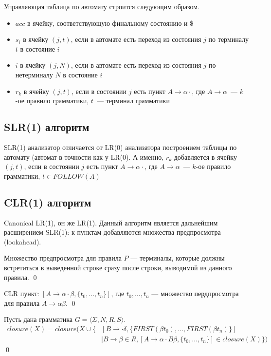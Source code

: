 Управляющая таблица по автомату строится следующим образом.

\begin{itemize}
    \item $acc$ в ячейку, соответствующую финальному состоянию и \$
    \item $s_i$ в ячейку $(j,t)$, если в автомате есть переход из состояния $j$ по терминалу $t$ в состояние $i$
    \item $i$ в ячейку $(j, N)$, если в автомате есть переход из состояния $j$ по нетерминалу $N$ в состояние $i$
    \item $r_k$ в ячейку $(j,t)$, если в состоянии $j$ есть пункт $A \to \alpha \cdot$, где $A \to \alpha$~--- $k$-ое правило грамматики, $t$~--- терминал грамматики
  \end{itemize}

\subsection{SLR(1) алгоритм}

SLR(1) анализатор отличается от LR(0) анализатора построением таблицы по автомату (автомат в точности как у LR(0).
А именно, $r_k$ добавляется в ячейку $(j,t)$, если в состоянии $j$ есть пункт $A \to \alpha \cdot$, где $A \to \alpha$~--- $k$-ое правило грамматики, $t \in FOLLOW(A)$

\subsection{CLR(1) алгоритм}

Canonical LR(1), он же LR(1).
Данный алгоритм является дальнейшим расширением SLR(1): к пунктам добавляются множества предпросмотра (lookahead).

\begin{definition}
Множество предпросмотра для правила $P$ --- терминалы, которые должны встретиться в выведенной строке сразу после строки, выводимой из данного правила.
\qed
\end{definition}

\begin{definition}
CLR пункт: $ [A \to \alpha \cdot \beta, \{ t_0, \dots, t_n\}] $,
где $t_0, \dots, t_n$ --- множество пердпросмотра для правила $A \to \alpha \beta$.
\qed
\end{definition}


\begin{definition}
Пусть дана грамматика $G = \langle \Sigma, N, R, S\rangle$.
\begin{align*}
 closure(X) = closure(X \cup \{&[B \to \cdot \delta, \{FIRST(\beta t_0), \dots, FIRST(\beta t_n)\}] \\
                               &\mid B \to \beta \in R, [A \to \alpha \cdot B \beta, \{t_0, \dots, t_n\}] \in closure(X)\})
\end{align*}
\qed
\end{definition}

